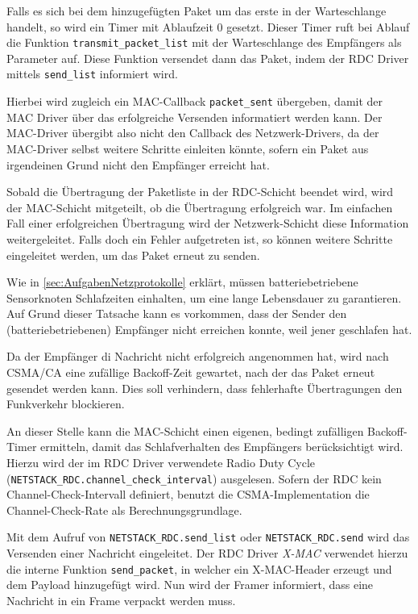 	Falls es sich bei dem hinzugefügten Paket um das erste in der
	Warteschlange handelt, so wird ein Timer mit Ablaufzeit \(0\) gesetzt.
	Dieser Timer ruft bei Ablauf die Funktion \lstinline=transmit_packet_list= mit der
	Warteschlange des Empfängers als Parameter auf.  Diese Funktion
	versendet dann das Paket, indem der RDC Driver mittels
	\lstinline=send_list= informiert wird.

	Hierbei wird zugleich ein MAC-Callback \lstinline=packet_sent= übergeben,
	damit der MAC Driver über das erfolgreiche Versenden informatiert
	werden kann.  Der MAC-Driver übergibt \iA also nicht den Callback des
	Netzwerk-Drivers, da der MAC-Driver selbst weitere Schritte einleiten
	könnte, sofern ein Paket aus irgendeinen Grund nicht den Empfänger
	erreicht hat.

\medskip

	Sobald die Übertragung der Paketliste in der RDC-Schicht beendet wird,
	wird der MAC-Schicht mitgeteilt, ob die Übertragung erfolgreich war.
	Im einfachen Fall einer erfolgreichen Übertragung wird der
	Netzwerk-Schicht diese Information weitergeleitet.  Falls doch ein
	Fehler aufgetreten ist, so können weitere Schritte eingeleitet werden,
	um das Paket erneut zu senden.

	Wie in \autoref{sec:AufgabenNetzprotokolle} erklärt, müssen
	batteriebetriebene Sensorknoten Schlafzeiten einhalten, um eine lange
	Lebensdauer zu garantieren.  Auf Grund dieser Tatsache kann es
	vorkommen, dass der Sender den (batteriebetriebenen) Empfänger nicht
	erreichen konnte, weil jener geschlafen hat.

	Da der Empfänger di Nachricht nicht erfolgreich angenommen hat, wird
	nach \acs{CSMA/CA} eine zufällige Backoff-Zeit gewartet, nach der das
	Paket erneut gesendet werden kann. Dies soll verhindern, dass
	fehlerhafte Übertragungen den Funkverkehr blockieren.

	An dieser Stelle kann die MAC-Schicht einen eigenen, bedingt zufälligen
	Backoff-Timer ermitteln, damit das Schlafverhalten des Empfängers
	berücksichtigt wird. Hierzu wird der im RDC Driver verwendete Radio
	Duty Cycle (\lstinline=NETSTACK_RDC.channel_check_interval=) ausgelesen.
	Sofern der RDC kein Channel-Check-Intervall definiert, benutzt die
	\acs{CSMA}-Implementation die Channel-Check-Rate als
	Berechnungsgrundlage.


	Mit dem Aufruf von \lstinline=NETSTACK_RDC.send_list= oder
	\lstinline=NETSTACK_RDC.send= wird das Versenden einer Nachricht
	eingeleitet.  Der RDC Driver \emph{X-MAC} verwendet hierzu die interne
	Funktion \lstinline=send_packet=, in welcher ein X-MAC-Header erzeugt und
	dem Payload hinzugefügt wird.  Nun wird der Framer informiert, dass
	eine Nachricht in ein Frame verpackt werden muss.

